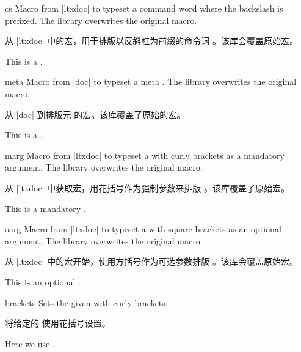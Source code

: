 \begin{docCommand}{cs}{}
Macro from |ltxdoc| \cite{carlisle:ltxdoc} to typeset a command word 
where the backslash is prefixed. The library overwrites the original macro.

从 |ltxdoc| \cite{carlisle:ltxdoc} 中的宏，用于排版以反斜杠为前缀的命令词 。该库会覆盖原始宏。
\begin{dispExample}
This is a .
\end{dispExample}
\end{docCommand}

\begin{docCommand}{meta}{}
Macro from |doc| \cite{mittelbach:2011a} to typeset a meta .
The library overwrites the original macro.

从 |doc| \cite{mittelbach:2011a} 到排版元  的宏。该库覆盖了原始的宏。
\begin{dispExample}
This is a .
\end{dispExample}
\end{docCommand}


\begin{docCommand}{marg}{}
Macro from |ltxdoc| \cite{carlisle:ltxdoc} to typeset a  with
curly brackets as a mandatory argument. The library overwrites the original macro.

从 |ltxdoc| \cite{carlisle:ltxdoc} 中获取宏，用花括号作为强制参数来排版 。该库覆盖了原始宏。
\begin{dispExample}
This is a mandatory .
\end{dispExample}
\end{docCommand}

\begin{docCommand}{oarg}{}
Macro from |ltxdoc| \cite{carlisle:ltxdoc} to typeset a  with
square brackets as an optional argument. The library overwrites the original macro.

从 |ltxdoc| \cite{carlisle:ltxdoc} 中的宏开始，使用方括号作为可选参数排版 。该库会覆盖原始宏。
\begin{dispExample}
This is an optional .
\end{dispExample}
\end{docCommand}


\begin{docCommand}{brackets}{}
Sets the given  with curly brackets.

将给定的  使用花括号设置。
\begin{dispExample}
Here we use .
\end{dispExample}
\end{docCommand}


